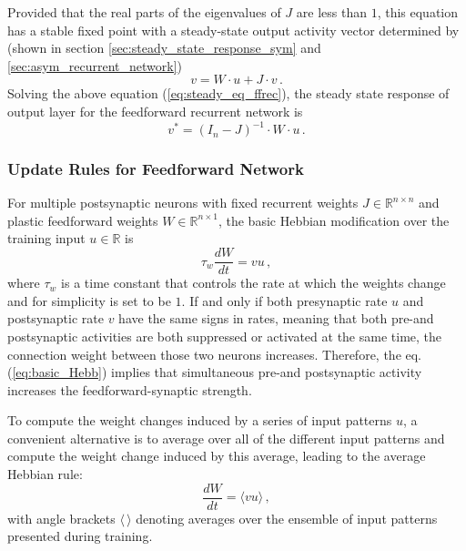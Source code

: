 \documentclass[11pt]{article}
\begin{document}
{	Provided that the real parts of the eigenvalues of $J$ are less than $1$, this equation has a stable fixed point with a steady-state output activity vector determined by (shown in section \ref{sec:steady_state_response_sym} and \ref{sec:asym_recurrent_network})
		\begin{equation} \label{eq:steady_eq_ffrec}
			v = W \cdot u + J \cdot v \, .
		\end{equation}
	Solving the above equation (\ref{eq:steady_eq_ffrec}), the steady state response of output layer for the feedforward recurrent network is
		\begin{equation} \label{eq:steady_state_ffrec}
			v^* = (I_n - J)^{-1} \cdot W \cdot u \, .
		\end{equation}
	
	\subsubsection{Update Rules for Feedforward Network}
	For multiple postsynaptic neurons with fixed recurrent weights $J \in \mathbb{R}^{n \times n}$ and plastic feedforward weights $W \in \mathbb{R}^{n \times 1}$, the basic Hebbian modification over the training input $u \in \mathbb{R}$ is 
		\begin{equation} \label{eq:basic_Hebb}
			\tau_w \frac{dW}{dt} = vu \, , 
		\end{equation}
	where $\tau_w$ is a time constant that controls the rate at which the weights change and for simplicity is set to be $1$. If and only if both presynaptic rate $u$ and postsynaptic rate $v$ have the same signs in rates, meaning that both pre-and postsynaptic activities are both suppressed or activated at the same time, the connection weight between those two neurons increases. Therefore, the eq.(\ref{eq:basic_Hebb}) implies that simultaneous pre-and postsynaptic activity increases the feedforward-synaptic strength.
	
	To compute the weight changes induced by a series of input patterns $u$, a convenient alternative is to average over all of the different input patterns and compute the weight change induced by this average, leading to the average Hebbian rule:
		\begin{equation} \label{eq:average_Hebb}
			\frac{dW}{dt} = \langle vu \rangle \, ,
		\end{equation}
	with angle brackets $\langle \, \rangle$ denoting averages over the ensemble of input patterns presented during training. 
	
}
\end{document}
